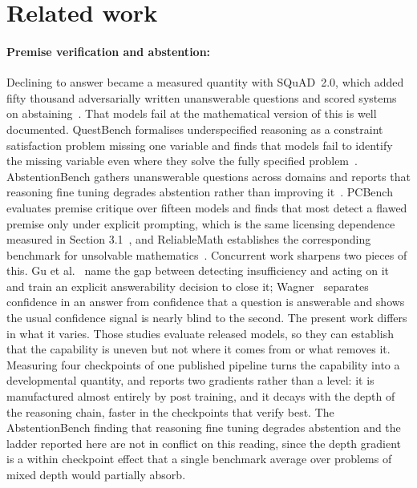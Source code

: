 \documentclass{article}
\begin{document}



\newpage
\appendix

\section{Related work}

\paragraph{Premise verification and abstention:} Declining to answer became a measured
quantity with SQuAD~2.0, which added fifty thousand adversarially written unanswerable
questions and scored systems on abstaining~\citep{rajpurkar2018squad2}. That models fail at
the mathematical version of this is well documented. QuestBench formalises underspecified reasoning as a
constraint satisfaction problem missing one variable and finds that models fail to identify
the missing variable even where they solve the fully specified
problem~\citep{li2025questbench}. AbstentionBench gathers unanswerable questions across
domains and reports that reasoning fine tuning degrades abstention rather than improving
it~\citep{kirichenko2025abstentionbench}. PCBench evaluates premise critique over fifteen
models and finds that most detect a flawed premise only under explicit prompting, which is
the same licensing dependence measured in Section 3.1~\citep{li2025premisecritique}, and
ReliableMath establishes the corresponding benchmark for unsolvable
mathematics~\citep{xue2025reliablemath}. Concurrent work sharpens two pieces of this. Gu et
al.~\citep{gu2026bridging} name the gap between detecting insufficiency and acting on it and
train an explicit answerability decision to close it; Wagner~\citep{wagner2026twoaxes}
separates confidence in an answer from confidence that a question is answerable and shows
the usual confidence signal is nearly blind to the second. The present work differs in what
it varies. Those studies evaluate released models, so they can establish that the capability
is uneven but not where it comes from or what removes it. Measuring four checkpoints of one
published pipeline turns the capability into a developmental quantity, and reports two
gradients rather than a level: it is manufactured almost entirely by post training, and it
decays with the depth of the reasoning chain, faster in the checkpoints that verify best.
The AbstentionBench finding that reasoning fine tuning degrades abstention and the ladder
reported here are not in conflict on this reading, since the depth gradient is a within
checkpoint effect that a single benchmark average over problems of mixed depth would
partially absorb.
\end{document}
